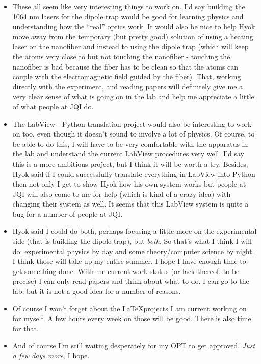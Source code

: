 \documentclass{report}
\theoremstyle{definition}
\begin{document}
\begin{itemize}
	
	\item These all seem like very interesting things to work on. I'd say building the 1064 nm lasers for the dipole trap would be good for learning physics and understanding how the ``real'' optics work. It would also be nice to help Hyok move away from the temporary (but pretty good) solution of using a heating laser on the nanofiber and instead to using the dipole trap (which will keep the atoms very close to but not touching the nanofiber - touching the nanofiber is bad because the fiber has to be clean so that the atoms can couple with the electromagnetic field guided by the fiber). That, working directly with the experiment, and reading papers will definitely give me a very clear sense of what is going on in the lab and help me appreciate a little of what people at JQI do. 
	
	
	\item The LabView - Python translation project would also be interesting to work on too, even though it doesn't sound to involve a lot of physics. Of course, to be able to do this, I will have to be very comfortable with the apparatus in the lab and understand the current LabView procedures very well. I'd say this is a more ambitious project, but I think it will be worth a try. Besides, Hyok said if I could successfully translate everything in LabView into Python then not only I get to show Hyok how his own system works but people at JQI will also come to me for help (which is kind of a crazy idea) with changing their system as well. It seems that this LabView system is quite a bug for a number of people at JQI. 
	
	
	\item Hyok said I could do both, perhaps focusing a little more on the experimental side (that is building the dipole trap), but \textit{both}. So that's what I think I will do: experimental physics by day and some theory/computer science by night. I think those will take up my entire summer. I hope I have enough time to get something done. With me current work status (or lack thereof, to be precise) I can only read papers and think about what to do. I can go to the lab, but it is not a good idea for a number of reasons.
	
	
	\item Of course I won't forget about the \LaTeX projects I am current working on for myself. A few hours every week on those will be good. There is also time for that. 
	
	\item And of course I'm still waiting desperately for my OPT to get approved. \textit{Just a few days more}, I hope. 
	
	
	\end{itemize}
\end{document}
